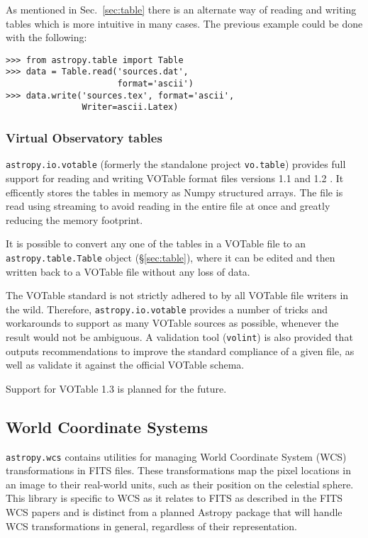 \documentclass[traditabstract]{aa}
\begin{document}
As mentioned in Sec.~\ref{sec:table} there is an alternate way of
reading and writing tables which is more intuitive in many cases.
The previous example could be done with the following:

\begin{verbatim}
>>> from astropy.table import Table
>>> data = Table.read('sources.dat',
                      format='ascii')
>>> data.write('sources.tex', format='ascii',
               Writer=ascii.Latex)
\end{verbatim}

\subsubsection{Virtual Observatory tables}

\texttt{astropy.io.votable} (formerly the standalone project
\texttt{vo.table}) provides full support for reading and writing
VOTable format files versions 1.1 and 1.2
\citep{ochsenbein2004votable,ochsenbein2009votable}.  It efficently
stores the tables in memory as Numpy structured arrays.  The file is
read using streaming to avoid reading in the entire file at once and
greatly reducing the memory footprint.

It is possible to convert any one of the tables in a VOTable file to
an \texttt{astropy.table.Table} object (\S\ref{sec:table}), where it
can be edited and then written back to a VOTable file without any loss
of data.

The VOTable standard is not strictly adhered to by all VOTable file
writers in the wild.  Therefore, \texttt{astropy.io.votable} provides
a number of tricks and workarounds to support as many VOTable sources
as possible, whenever the result would not be ambiguous.  A validation
tool (\texttt{volint}) is also provided that outputs recommendations
to improve the standard compliance of a given file, as well as
validate it against the official VOTable schema.

Support for VOTable 1.3 is planned for the future.

\subsection{World Coordinate Systems}

\label{sec:wcs}


\texttt{astropy.wcs} contains utilities for managing World Coordinate
System (WCS) transformations in FITS files.  These transformations map
the pixel locations in an image to their real-world units, such as
their position on the celestial sphere.  This library is specific to
WCS as it relates to FITS as described in the FITS WCS papers
\citep{greisen2002wcs,calabretta2002wcs,greisen2006wcs} and is
distinct from a planned Astropy package that will handle WCS
transformations in general, regardless of their representation.
\end{document}
